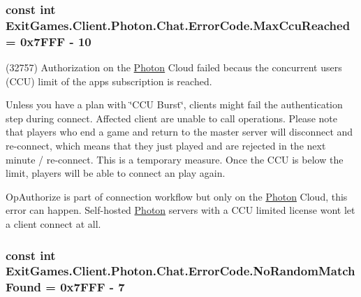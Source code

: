 \subsubsection[{\texorpdfstring{Max\+Ccu\+Reached}{MaxCcuReached}}]{\setlength{\rightskip}{0pt plus 5cm}const int Exit\+Games.\+Client.\+Photon.\+Chat.\+Error\+Code.\+Max\+Ccu\+Reached = 0x7\+F\+F\+F -\/ 10}\hypertarget{class_exit_games_1_1_client_1_1_photon_1_1_chat_1_1_error_code_ab1d9ee69b2b2f4112c84e6d3c2c54b6c}{}\label{class_exit_games_1_1_client_1_1_photon_1_1_chat_1_1_error_code_ab1d9ee69b2b2f4112c84e6d3c2c54b6c}


(32757) Authorization on the \hyperlink{namespace_exit_games_1_1_client_1_1_photon}{Photon} Cloud failed becaus the concurrent users (C\+CU) limit of the app\textquotesingle{}s subscription is reached. 

Unless you have a plan with \char`\"{}\+C\+C\+U Burst\char`\"{}, clients might fail the authentication step during connect. Affected client are unable to call operations. Please note that players who end a game and return to the master server will disconnect and re-\/connect, which means that they just played and are rejected in the next minute / re-\/connect. This is a temporary measure. Once the C\+CU is below the limit, players will be able to connect an play again.

Op\+Authorize is part of connection workflow but only on the \hyperlink{namespace_exit_games_1_1_client_1_1_photon}{Photon} Cloud, this error can happen. Self-\/hosted \hyperlink{namespace_exit_games_1_1_client_1_1_photon}{Photon} servers with a C\+CU limited license won\textquotesingle{}t let a client connect at all. 
\subsubsection[{\texorpdfstring{No\+Random\+Match\+Found}{NoRandomMatchFound}}]{\setlength{\rightskip}{0pt plus 5cm}const int Exit\+Games.\+Client.\+Photon.\+Chat.\+Error\+Code.\+No\+Random\+Match\+Found = 0x7\+F\+F\+F -\/ 7}\hypertarget{class_exit_games_1_1_client_1_1_photon_1_1_chat_1_1_error_code_ae5450434e0a521ecfa9491c225e59fce}{}\label{class_exit_games_1_1_client_1_1_photon_1_1_chat_1_1_error_code_ae5450434e0a521ecfa9491c225e59fce}



